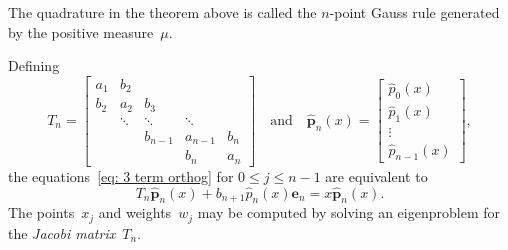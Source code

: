 \documentclass[12pt,a4paper]{article}
\newcommand{\hatvecp}{\hat{\boldsymbol{p}}}
\begin{document}
The quadrature in the theorem above is called the $n$-point Gauss 
rule generated by the positive measure~$\mu$.

Defining
\[
T_n=\begin{bmatrix}
a_1&b_2   &       &       &\\
b_2&a_2   &b_3    &       &\\
   &\ddots&\ddots &\ddots &\\
   &      &b_{n-1}&a_{n-1}&b_n\\
   &      &       &b_n    &a_n
\end{bmatrix}
\quad\text{and}\quad
\hatvecp_n(x)=\begin{bmatrix}
	\hat p_0(x)\\ \hat p_1(x)\\ \vdots\\ \hat p_{n-1}(x)
\end{bmatrix},
\]
the equations~\eqref{eq: 3 term orthog} for $0\le j\le n-1$ are 
equivalent to
\begin{equation}\label{eq: matrix 3 term orthog}
T_n\hatvecp_n(x)+b_{n+1}\hat p_n(x)\boldsymbol{e}_n=x\hatvecp_n(x).
\end{equation}
The points~$x_j$ and weights~$w_j$ may be computed by solving an 
eigenproblem for the \emph{Jacobi matrix}~$T_n$.
\end{document}
